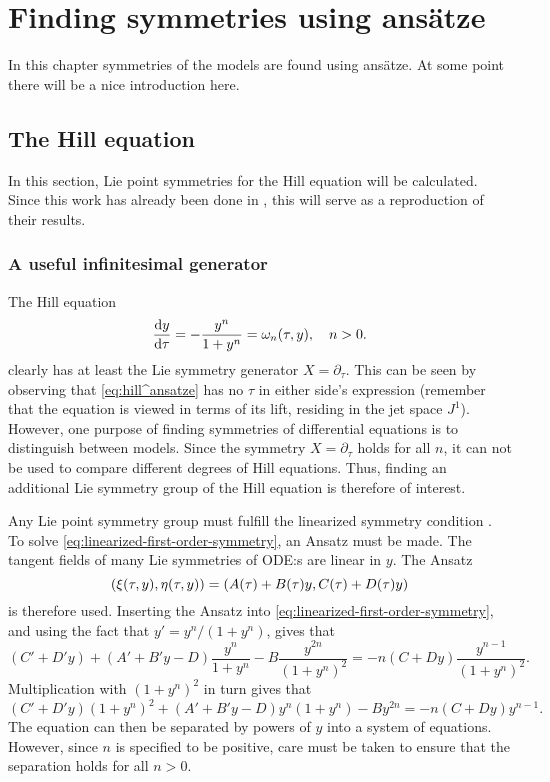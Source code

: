 \chapter{Finding symmetries using ansätze}

In this chapter symmetries of the models are found using ansätze.
At some point there will be a nice introduction here.

\section{The Hill equation}

In this section, Lie point symmetries for the Hill equation will be calculated.
Since this work has already been done in \cite{ohlsson2020symmetry}, this will serve as a reproduction of their results.

\subsection{A useful infinitesimal generator}

The Hill equation
\begin{equation} \label{eq:hill^ansatze}
  \diff{y}{\tau} = - \frac{y^n}{1 + y^n} = \omega_n(\tau, y), \quad
  n > 0.
\end{equation}
clearly has at least the Lie symmetry generator \(X=\partial_\tau\).
This can be seen by observing that \cref{eq:hill^ansatze} has no \(\tau\) in either side's expression (remember that the equation is viewed in terms of its lift, residing in the jet space \(J^1\)).
However, one purpose of finding symmetries of differential equations is to distinguish between models.
Since the symmetry \(X=\partial_\tau\) holds for all \(n\), it can not be used to compare different degrees of Hill equations.
Thus, finding an additional Lie symmetry group of the Hill equation is therefore of interest.

Any Lie point symmetry group must fulfill the linearized symmetry condition .
To solve \cref{eq:linearized-first-order-symmetry}, an Ansatz must be made.
The tangent fields of many Lie symmetries of ODE:s are linear in \(y\).
The Ansatz
\begin{equation}
  \pqty{\xi(\tau,y),\eta(\tau,y)} = \pqty{A(\tau) + B(\tau)y,C(\tau) + D(\tau)y}
\end{equation}
is therefore used.
Inserting the Ansatz into \cref{eq:linearized-first-order-symmetry}, and using the fact that \(y' = y^n / (1 + y^n)\), gives that
\begin{equation}
  (C' + D'y) + (A' + B'y - D) \frac{y^n}{1 + y^n} - B \frac{y^{2n}}{(1 + y^n)^2} =
  -n(C + Dy) \frac{y^{n-1}}{(1 + y^n)^2}.
\end{equation}
Multiplication with \((1 + y^n)^2\) in turn gives that
\begin{equation} \label{eq:hill-linear-symmetry}
  (C' + D'y)(1 + y^n)^2 + (A' + B'y - D)y^n(1 + y^n) - By^{2n} =
  -n(C + Dy) y^{n-1}.
\end{equation}
The equation can then be separated by powers of \(y\) into a system of equations.
However, since \(n\) is specified to be positive, care must be taken to ensure that the separation holds for all \(n>0\).


